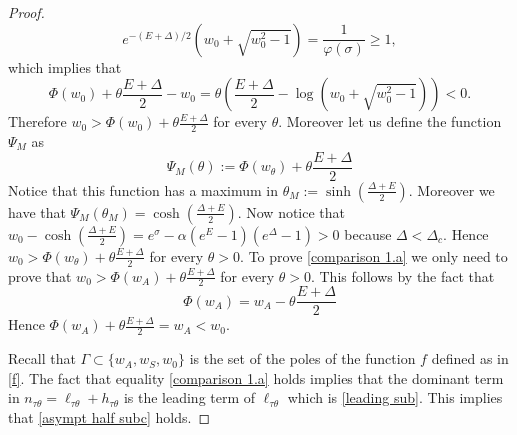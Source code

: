 \documentclass{article}
\numberwithin{equation}{section}
\theoremstyle{plain}
\begin{document}
\begin{proof}
\[
e^{- (E+ \Delta) /2} \left(w_0 + \sqrt{w_0^2 -1 } \right) = \frac{1}{\varphi(\sigma) } \geq 1, 
\]
which implies that 
\[ 
\Phi(w_0) + \theta \frac{E+ \Delta }{2 }  - w_0 = \theta \left( \frac{E+ \Delta }{2 } - \log\left(w_0 + \sqrt{w_0^2 -1 } \right) \right)  <0. 
\]
Therefore $w_0 > \Phi(w_0) +  \theta \frac{E+ \Delta }{2 } $ for every $\theta $. 
Moreover let us define the function $\Psi_M$ as 
\[ 
\Psi_M (\theta ):= \Phi(w_\theta) + \theta \frac{E+ \Delta }{2}
\]
Notice that this function has a maximum in $\theta_M := \sinh \left( \frac{\Delta + E }{2}  \right) $. 
Moreover we have that $\Psi_M(\theta_M )= \cosh \left( \frac{\Delta + E }{2}  \right) $. 
Now notice that $w_0- \cosh \left( \frac{\Delta + E }{2}  \right) =e^\sigma - \alpha (e^E-1) (e^\Delta -1 )>0  $ because $\Delta < \Delta_c$. 
Hence $w_0 > \Phi(w_\theta) + \theta \frac{E+ \Delta }{2}$ for every $\theta>0$. To prove \eqref{comparison 1.a} we only need to prove that $w_0 > \Phi(w_A) + \theta \frac{E+ \Delta }{2}$ for every $\theta>0$. This follows by the fact that
\[
\Phi(w_A)= w_A- \theta \frac{E+\Delta }{2}
\]
Hence $ \Phi(w_A)+ \theta \frac{E+\Delta }{2}=w_A < w_0$. 

Recall that $\Gamma \subset \{ w_A, w_S, w_0 \} $ is the set of the poles of the function $f$ defined as in \eqref{f}. The fact that equality \eqref{comparison 1.a} holds implies that the dominant term in $ n_{\tau \theta } = \ell_{\tau \theta } + h_{\tau \theta } $ is the leading term of $\ell_{\tau \theta } $ which is \eqref{leading sub}. 
This implies that \eqref{asympt half subc} holds. 
\end{proof}
\end{document}
